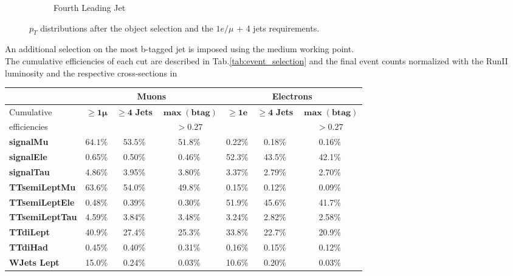 \begin{figure}[H]
\begin{subfigure}{0.42\linewidth}
         \caption{Fourth Leading Jet}
     \end{subfigure}
        \caption{$p_T$ distributions after the object selection and the $1e/\mu$ + 4 jets requirements.}
\end{figure}
\vspace{-0.5cm}
An additional selection on the most b-tagged jet is imposed using the medium working point.\\
The cumulative efficiencies of each cut are described in Tab.\ref{tab:event_selection} and the final event counts normalized with the RunII luminosity and the respective cross-sections in 
\begin{table}[H]
    \centering
    \fontsize{11.pt}{11.pt}\selectfont
    \begin{tabular}{l|ccc||ccc}
        \toprule
         &  \multicolumn{3}{c||}{\textbf{Muons}} &\multicolumn{3}{c}{\textbf{Electrons}} \\
         \midrule
         \midrule
         Cumulative& \multirow{2}{*}{$\bm{\geq1 \mu}$} & \multirow{2}{*}{$\bm{\geq4}$ \textbf{Jets}} & $\bm{\max({\textbf{btag}})}$& \multirow{2}{*}{$\bm{\geq1e}$} & \multirow{2}{*}{$\bm{\geq4}$ \textbf{Jets}} & $\bm{\max({\textbf{btag}})}$\\
         efficiencies&&&$\bm{>0.27}$&&&$\bm{>0.27}$\\
         \midrule
         \textbf{signalMu}& $64.1\%$ & $53.5\%$ & $51.8\%$ &0.22\% & 0.18\% & 0.16\%\\
         \midrule
         \textbf{signalEle}& 0.65\% & 0.50\% & 0.46\% & 52.3\% & 43.5\% & 42.1\% \\
         \midrule
         \textbf{signalTau}& 4.86\% & 3.95\% & 3.80\% & 3.37\% & 2.79\% & 2.70\%\\
         \midrule
         \textbf{TTsemiLeptMu}& 63.6\% & 54.0\% & 49.8\% & 0.15\% & 0.12\% & 0.09\% \\
         \midrule
         \textbf{TTsemiLeptEle}& 0.48\% & 0.39\% & 0.30\% & 51.9\% & 45.6\% & 41.7\% \\
         \midrule
         \textbf{TTsemiLeptTau}&4.59\%  & 3.84\% & 3.48\% &3.24\% &2.82\% &2.58\%\\
         \midrule
         \textbf{TTdiLept}& 40.9\% & 27.4\% & 25.3\% & 33.8\% &22.7\% &20.9\% \\
         \midrule
         \textbf{TTdiHad}& 0.45\%  & 0.40\% & 0.31\% & 0.16\% &0.15\% &0.12\% \\
         \midrule
         \textbf{WJets Lept}& 15.0\% & 0.24\% & 0.03\% & 10.6\% & 0.20\% &0.03\%\\

\end{tabular}
\end{table}
